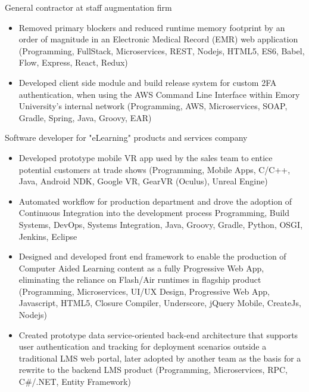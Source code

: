 \divider




General contractor at staff augmentation firm

\begin{itemize}
  \item Removed primary blockers and reduced runtime memory footprint by an order of magnitude in an Electronic Medical Record (EMR) web application {\tiny (Programming, FullStack, Microservices, REST, Nodejs, HTML5, ES6, Babel, Flow, Express, React, Redux)}
\end{itemize}

\begin{itemize}
  \item Developed client side module and build release system for custom 2FA authentication, when using the AWS Command Line Interface within Emory University’s internal network {\tiny (Programming, AWS, Microservices, SOAP, Gradle, Spring, Java, Groovy, EAR)}
\end{itemize}

\divider




Software developer for "eLearning" products and services company

\begin{itemize}
  \item Developed prototype mobile VR app used by the sales team to entice potential customers at trade shows {\tiny (Programming, Mobile Apps, C/C++, Java, Android NDK, Google VR, GearVR (Oculus), Unreal Engine)}
  \item Automated workflow for production department and drove the adoption of Continuous Integration into the development process {\tiny Programming, Build Systems, DevOps, Systems Integration, Java, Groovy, Gradle, Python, OSGI, Jenkins, Eclipse}
  \item Designed and developed front end framework to enable the production of Computer Aided Learning content as a fully Progressive Web App, eliminating the reliance on Flash/Air runtimes in flagship product {\tiny (Programming, Microservices, UI/UX Design, Progressive Web App, Javascript, HTML5, Closure Compiler, Underscore, jQuery Mobile, CreateJs, Nodejs) }
  \item Created prototype data service-oriented back-end architecture that supports user authentication and tracking for deployment scenarios outside a traditional LMS web portal, later adopted by another team as the basis for a rewrite to the backend LMS product {\tiny (Programming, Microservices, RPC, C\#/.NET, Entity Framework)}
\end{itemize}

